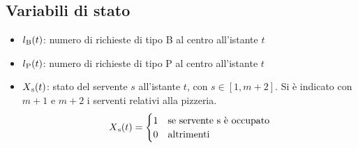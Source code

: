 \documentclass[a4paper, 12pt]{article}
\begin{document}
\subsection{Variabili di stato}
\begin{itemize}
  \item $l\textsubscript{B}(t)$: numero di richieste di tipo B al centro all'istante $t$
  \item $l\textsubscript{P}(t)$: numero di richieste di tipo P al centro all'istante $t$
  \item $X\textsubscript{s}(t)$: stato del servente $s$ all'istante $t$, 
  con $s \in [1, m + 2]$. \newline
  Si è indicato con $m+1$ e $m+2$ i serventi relativi alla pizzeria.  
  \[
      X\textsubscript{s}(t) = 
  \begin{cases}
      1& \text{se servente s è occupato}\\ 
      0              & \text{altrimenti}
  \end{cases}
  \]
\end{itemize}
\end{document}
